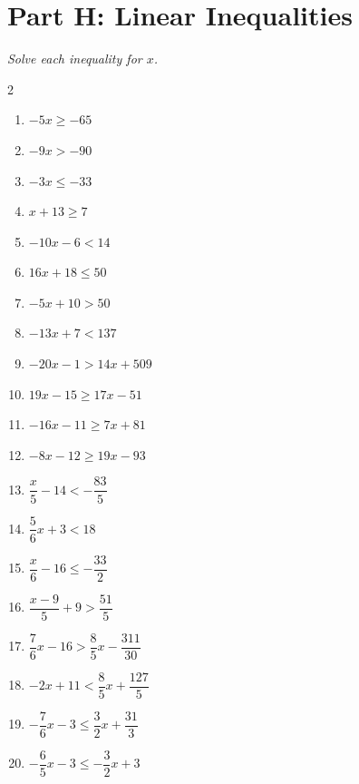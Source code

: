\documentclass[11pt]{article}
\begin{document}
\section*{Part H: Linear Inequalities}
\noindent\textit{Solve each inequality for $x$.}
\begin{multicols}{2}
\begin{enumerate}
  \item $-5x \ge -65$
  \vspace{1.8cm}
  \item $-9x > -90$
  \vspace{1.8cm}
  \item $-3x \le -33$
  \vspace{1.8cm}
  \item $x + 13 \ge 7$
  \vspace{1.8cm}
  \item $-10x - 6 < 14$
  \vspace{1.8cm}
  \item $16x + 18 \le 50$
  \vspace{1.8cm}
  \item $-5x + 10 > 50$
  \vspace{1.8cm}
  \item $-13x + 7 < 137$
  \vspace{1.8cm}
  \item $-20x - 1 > 14x + 509$
  \vspace{1.8cm}
  \item $19x - 15 \ge 17x - 51$
  \vspace{1.8cm}
  \item $-16x - 11 \ge 7x + 81$
  \vspace{1.8cm}
  \item $-8x - 12 \ge 19x - 93$
  \vspace{1.8cm}
  \item $\dfrac{x}{5} - 14 < -\dfrac{83}{5}$
  \vspace{1.8cm}
  \item $\dfrac{5}{6}x + 3 < 18$
  \vspace{1.8cm}
  \item $\dfrac{x}{6} - 16 \le -\dfrac{33}{2}$
  \vspace{1.8cm}
  \item $\dfrac{x - 9}{5} + 9 > \dfrac{51}{5}$
  \vspace{1.8cm}
  \item $\dfrac{7}{6}x - 16 > \dfrac{8}{5}x - \dfrac{311}{30}$
  \vspace{1.8cm}
  \item $-2x + 11 < \dfrac{8}{5}x + \dfrac{127}{5}$
  \vspace{1.8cm}
  \item $-\dfrac{7}{6}x - 3 \le \dfrac{3}{2}x + \dfrac{31}{3}$
  \vspace{1.8cm}
  \item $-\dfrac{6}{5}x - 3 \le -\dfrac{3}{2}x + 3$
  \vspace{1.8cm}
\end{enumerate}
\end{multicols}
\end{document}
